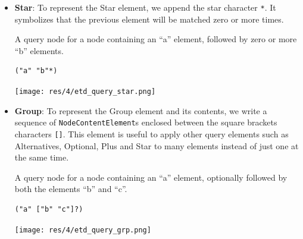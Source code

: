 \begin{chapterBody}
\begin{itemize}
\begin{minipage}{.3\linewidth}
A query node for a node containing an ``a'' element, followed by one
or more ``b'' elements.
\end{minipage}
\hspace{.02\linewidth}
\begin{minipage}{.3\linewidth}
\begin{lstlisting}[language=etl]
("a" "b"+)
\end{lstlisting} 
\end{minipage}
\hspace{.02\linewidth}
\begin{minipage}{.3\linewidth}
\texttt{[image: res/4/etd\_query\_plus.png]}
\end{minipage}

    \item \textbf{Star}: To represent the Star element, we append the star
character \texttt{*}.  It symbolizes that the previous element will be matched zero or more times.

\begin{minipage}{.3\linewidth}
A query node for a node containing an ``a'' element, followed by zero
or more ``b'' elements.
\end{minipage}
\hspace{.02\linewidth}
\begin{minipage}{.3\linewidth}
\begin{lstlisting}[language=etl]
("a" "b"*)
\end{lstlisting} 
\end{minipage}
\hspace{.02\linewidth}
\begin{minipage}{.3\linewidth}
\texttt{[image: res/4/etd\_query\_star.png]}
\end{minipage}

    \item \textbf{Group}: To represent the Group element and its contents,
we write a sequence of \hfill\break
\texttt{NodeContentElement}s enclosed between the square brackets characters
\texttt{[]}. This element is useful to apply other query elements such as
Alternatives, Optional, Plus and Star to many elements instead of just one at
the same time.

\begin{minipage}{.3\linewidth}
A query node for a node containing an ``a'' element, optionally followed
by both the elements ``b'' and ``c''.
\end{minipage}
\hspace{.02\linewidth}
\begin{minipage}{.3\linewidth}
\begin{lstlisting}[language=etl]
("a" ["b" "c"]?)
\end{lstlisting} 
\end{minipage}
\hspace{.02\linewidth}
\begin{minipage}{.3\linewidth}
\texttt{[image: res/4/etd\_query\_grp.png]}
\end{minipage}
\end{itemize}


\end{chapterBody}
